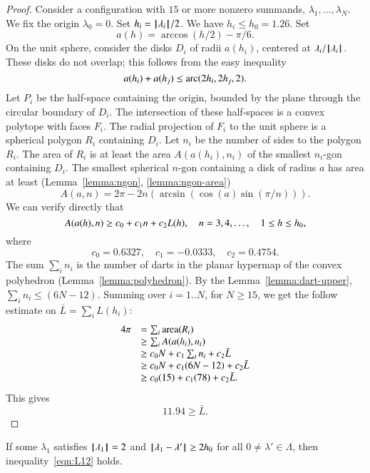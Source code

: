 \begin{proof} 
Consider a configuration with $15$ or more nonzero summands, $\lambda_1,\ldots,\lambda_N$. 
We fix the origin $\lambda_0=0$.  Set $h_i = {{\hskip0.1em|\hskip-0.15em|\hskip0.1em}\lambda_i{\hskip0.1em|\hskip-0.15em|\hskip0.1em}}/2$.  We have $h_i\le h_0=1.26$.  Set
$$
a(h) = \arccos(h/2) - \pi/6.
$$
On the unit sphere,  consider the disks $D_i$ of radii $a(h_i)$, centered at $\lambda_i/{{\hskip0.1em|\hskip-0.15em|\hskip0.1em}\lambda_i{\hskip0.1em|\hskip-0.15em|\hskip0.1em}}$.  These disks do not overlap; this follows from the easy inequality~\cite[cc:disks]{hales:2009:nonlinear} %
$$
a(h_i) + a(h_j) \le {\operatorname{arc}}(2h_i,2h_j,2).
$$
Let $P_i$ be the half-space containing the origin, bounded by the plane through the circular boundary of $D_i$.  The intersection of these half-spaces is a convex polytope with faces $F_i$.  The radial projection of $F_i$ to the unit sphere is a spherical polygon $R_i$ containing $D_i$.  Let $n_i$ be the number of sides to the polygon $R_i$.  The area of $R_i$ is at least the area $A(a(h_i),n_i)$ of the smallest $n_i$-gon containing $D_i$.  The smallest spherical $n$-gon containing a disk of radius $a$ has area at least (Lemma~\ref{lemma:ngon}, \ref{lemma:ngon-area})
$$
A(a,n) = 2\pi - 2 n (\arcsin(\cos(a)\sin(\pi/n))).
$$
We can verify directly that~\cite[cc:alin]{hales:2009:nonlinear} %
$$
A(a(h),n) \ge c_0 + c_1 n + c_2 L(h),\quad
n = 3,4,\ldots,\quad 1\le h\le {h_0},
$$
where
$$c_0 = 0.6327,\quad c_1 = -0.0333,\quad c_2 = 0.4754.$$
The sum $\sum_i n_i$ is the number of darts in the planar hypermap of
the convex polyhedron (Lemma~\ref{lemma:polyhedron}).  By the Lemma~\ref{lemma:dart-upper}, 
$\sum_i n_i \le (6N-12)$.
Summing over $i=1..N$, for $N\ge 15$, we get the follow
estimate on $\bar L = \sum_i L(h_i)$:
$$
\begin{array}{lll}
4\pi &= \sum_i{\operatorname{area}}(R_i)\\
     &\ge \sum_i A(a(h_i),n_i) \\
     &\ge c_0 N +c_1\sum_i n_i + c_2 \bar L\\
     &\ge c_0 N +c_1 (6N-12) + c_2 \bar L\\
     &\ge c_0 (15) +c_1 (78) + c_2 \bar L.\\
\end{array}
$$
This gives
$$
11.94 \ge \bar L. 
$$
\end{proof} 


\begin{lemma}\label{300}\label{lemma:D'}  
If some $\lambda_1$ satisfies ${{\hskip0.1em|\hskip-0.15em|\hskip0.1em}\lambda_1{\hskip0.1em|\hskip-0.15em|\hskip0.1em}}=2$ and
${\hskip0.1em|\hskip-0.15em|\hskip0.1em}\lambda_1 - \lambda'{\hskip0.1em|\hskip-0.15em|\hskip0.1em}\ge 2{h_0}$ for all $0\ne\lambda'\in\Lambda$,
then  inequality~\ref{eqn:L12} holds.
\end{lemma}

